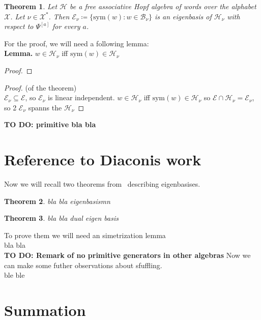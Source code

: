 \documentclass[a4paper, 12pt]{report}
\newtheorem{theorem}{Theorem}
\newcommand{\todo}[1]{\hfill \break \textbf{\Huge TO DO: #1 \hfill \break}\normalsize}
\begin{document}
\begin{theorem}
Let $\mathcal{H}$ be a free associative Hopf algebra of words over the alphabet $\mathcal{X}$. 
Let $\nu \in \mathcal{X}^*$. Then $\mathcal{E}_\nu \coloneqq \{\mathrm{sym}(w) : w \in \mathcal{B}_\nu\}$ is 
an eigenbasis of 
$\mathcal{H}_\nu$ with respect to $\Psi^{[a]}$ for every $a$.
\end{theorem}

For the proof, we will need a following lemma: \\
\noindent \textbf{Lemma.} $w \in \mathcal{H}_\nu$ iff $\mathrm{sym}(w) \in \mathcal{H}_\nu$
\begin{proof}

\end{proof}
\begin{proof}(of the theorem) \\ 
$\mathcal{E}_\nu \subseteq\mathcal{E}$, 
so $\mathcal{E}_\nu$ is linear independent. $w \in \mathcal{H}_\nu$ iff 
$\mathrm{sym}(w) \in \mathcal{H}_\nu$ so $\mathcal{E} \cap \mathcal{H}_\nu = \mathcal{E}_\nu$, so 2
$\mathcal{E}_\nu$ spanns the $\mathcal{H}_\nu$
\end{proof}


\todo{primitive bla bla}
\section{Reference to Diaconis work}
Now we will recall two theorems from~\cite{Diaconis2014} describing eigenbasises.
\begin{theorem}
bla bla eigenbasismn   
\end{theorem}
\begin{theorem}
bla bla dual eigen basis
\end{theorem}
To prove them we will need an simetrization lemma \\
bla bla\\[8pt]
\todo{Remark of no primitive generators in other algebras}
Now we can make some futher observations about sfuffling.\\
ble ble\\

\section{Summation}


{}

\end{document}
